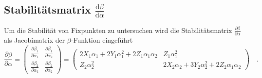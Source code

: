 \documentclass{article}
\renewcommand{\d}{\text{d}}
\begin{document}
  \subsection{Stabilitätsmatrix $\frac{\d \beta}{\d \alpha}$}
	Um die Stabilität von Fixpunkten zu untersuchen wird die Stabilitätsmatrix $\frac{\partial \beta}{\partial \alpha}$ als Jacobimatrix der 
	$\beta$-Funktion eingeführt
	\begin{equation}
	 \frac{\partial \beta}{\partial \alpha}=\begin{pmatrix}
	                                         \frac{\partial \beta_1}{\partial \alpha_1} & \frac{\partial \beta_1}{\partial \alpha_2} \\
	                                         \frac{\partial \beta_2}{\partial \alpha_1} & \frac{\partial \beta_2}{\partial \alpha_2}
	                                        \end{pmatrix} 
	                                       =\begin{pmatrix}
	                                         2X_1\alpha_1 +2Y_1 \alpha_1^2+2Z_1\alpha_1 \alpha_2 & Z_1 \alpha_1^2\\
	                                         Z_2 \alpha_2^2 & 2X_2 \alpha_2 +3 Y_2 \alpha_2^2 +2 Z_2 \alpha_1 \alpha_2
	                                        \end{pmatrix} \quad .
	\end{equation}

	
	
\end{document}
